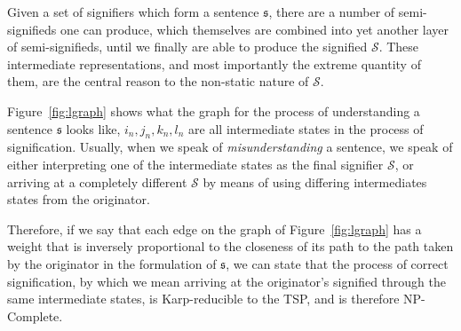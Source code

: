 \documentclass[11pt,letterpaper]{article}
\theoremstyle{definition}
\begin{document}
Given a set of signifiers which form a sentence \(\mathfrak{s}\), there are a number of semi-signifieds one can produce, which themselves are combined into yet another layer of semi-signifieds, until we finally are able to produce the signified \(\mathscr{S}\). These intermediate representations, and most importantly the extreme quantity of them, are the central reason to the non-static nature of \(\mathscr{S}\).
\begin{center}
    \label{fig:lgraph}
\end{center}
\newpage
Figure~\ref{fig:lgraph} shows what the graph for the process of understanding a sentence \(\mathfrak{s}\) looks like, \(i_n, j_n, k_n, l_n\) are all intermediate states in the process of signification. Usually, when we speak of \emph{misunderstanding} a sentence, we speak of either interpreting one of the intermediate states as the final signifier \(\mathscr{S}\), or arriving at a completely different \(\mathscr{S}\) by means of using differing intermediates states from the originator.

Therefore, if we say that each edge on the graph of Figure~\ref{fig:lgraph} has a weight that is inversely proportional to the closeness of its path to the path taken by the originator in the formulation of \(\mathfrak{s}\), we can state that the process of correct signification, by which we mean arriving at the originator's signified through the same intermediate states, is Karp-reducible to the TSP, and is therefore NP-Complete.
\end{document}
